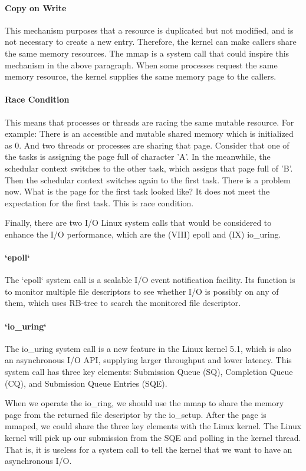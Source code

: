 \documentclass[12pt,a4paper]{article}
\begin{document}
\paragraph{Copy on Write}
This mechanism purposes that a resource is duplicated but not modified, and is not
necessary to create a new entry. Therefore, the kernel can make callers share
the same memory resources. The mmap is a system call that could inspire this
mechanism in the above paragraph. When some processes request the same memory resource,
the kernel supplies the same memory page to the callers.

\paragraph{Race Condition}
This means that processes or threads are racing the same mutable resource. For example:
There is an accessible and mutable shared memory which is initialized as 0. And
two threads or processes are sharing that page. Consider that one of the tasks is assigning
the page full of character 'A'. In the meanwhile, the schedular context switches to
the other task, which assigns that page full of 'B'. Then the schedular context switches
again to the first task. There is a problem now. What is the page for the first
task looked like? It does not meet the expectation for the first task.
This is race condition.

Finally, there are two I/O Linux system calls that would be considered to enhance
the I/O performance, which are the (\RN{8}) epoll and (\RN{9}) io\_uring.

\paragraph{`epoll`}
The `epoll` system call is a scalable I/O event notification facility. Its function
is to monitor multiple file descriptors to see whether I/O is possibly on any of
them, which uses RB-tree to search the monitored file descriptor.

\paragraph{`io\_uring`}
The io\_uring system call is a new feature in the Linux kernel 5.1, which is also an
asynchronous I/O API, supplying larger throughput and lower latency. This system call
has three key elements: Submission Queue (SQ), Completion Queue (CQ), and Submission Queue
Entries (SQE).

When we operate the io\_ring, we should use the mmap to share the memory page from
the returned file descriptor by the io\_setup. After the page is mmaped, we could share
the three key elements with the Linux kernel. The Linux kernel will pick up our submission
from the SQE and polling in the kernel thread. That is, it is useless for a system call
to tell the kernel that we want to have an asynchronous I/O.
\end{document}
